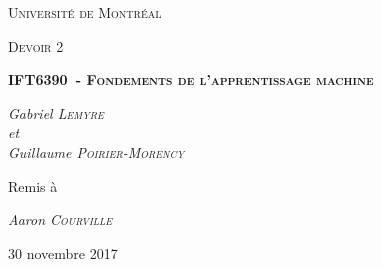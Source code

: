 \documentclass[11pt,letterpaper]{article}
\newcommand{\TypeRemise}{Devoir 2}
\newcommand{\sigleCours}{IFT6390}
\newcommand{\titreCours}{Fondements de l'apprentissage machine}
\newcommand{\PrenomUn}{Gabriel}
\newcommand{\NomUn}{Lemyre}
\newcommand{\PrenomDeux}{Guillaume}
\newcommand{\NomDeux}{Poirier-Morency}
\newcommand{\PrenomProf}{Aaron}
\newcommand{\NomFamilleProf}{Courville}
\newcommand{\dateremise}{30 novembre 2017}
\newcommand{\CreateurNom}[2]{#1 \textsc{#2}\ }
\newcommand{\CoUn}{\CreateurNom{\PrenomUn}{\NomUn}}
\newcommand{\CoDeux}{\CreateurNom{\PrenomDeux}{\NomDeux}}
\newcommand{\NomProf}{\CreateurNom{\PrenomProf}{\NomFamilleProf}}
\theoremstyle{definition}
\begin{document}
\begin{titlepage}
	\centering
	{\scshape\LARGE Université de Montréal \par}
	\vspace{1cm}
	{\scshape\Large \TypeRemise \par}
	\vspace{1.5cm}
	{\huge\bfseries \sigleCours \ - \textsc{\titreCours} \par}
	\vspace{2cm}
	{\Large\itshape \CoUn \\ et \\ \CoDeux \par}
	\vfill
	Remis à \par
	{\Large\itshape \NomProf \\}

	\vfill

	{\large \dateremise \par}
\end{titlepage}
\clearpage

\end{document}
